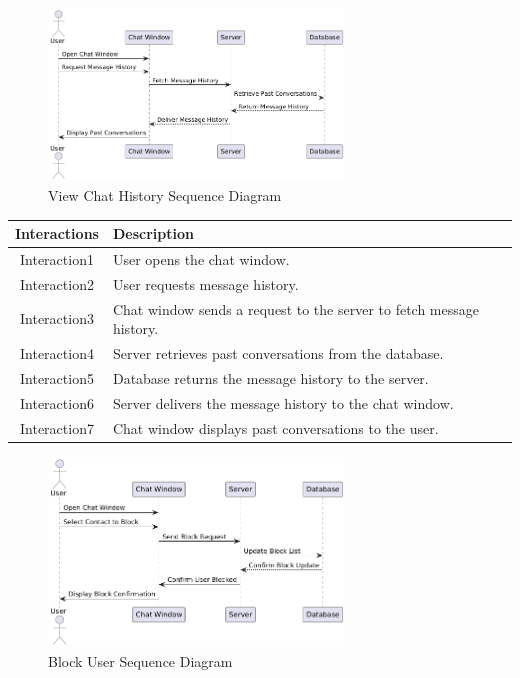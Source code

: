 \begin{figure}[h]
    \centering
    \includegraphics[width=0.7\textwidth]{images/chat_history.png} %
    \caption{View Chat History Sequence Diagram}
    \label{fig:example}
\end{figure}


\begin{longtable}{|c|p{10cm}|}
    \hline
    \textbf{Interactions} & \textbf{Description} \\
    \hline
    Interaction1 & User opens the chat window. \\
    \hline
    Interaction2 & User requests message history. \\
    \hline
    Interaction3 & Chat window sends a request to the server to fetch message history. \\
    \hline
    Interaction4 & Server retrieves past conversations from the database. \\
    \hline
    Interaction5 & Database returns the message history to the server. \\
    \hline
    Interaction6 & Server delivers the message history to the chat window. \\
    \hline
    Interaction7 & Chat window displays past conversations to the user. \\
    \hline
\end{longtable}
\newpage

\begin{figure}[h]
    \centering
    \includegraphics[width=0.7\textwidth]{images/block_user.png} %
    \caption{Block User Sequence Diagram}
    \label{fig:example}
\end{figure}


